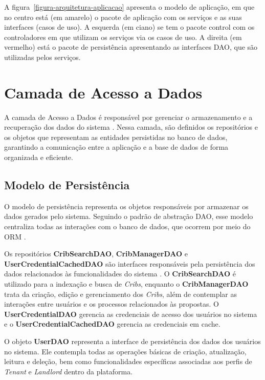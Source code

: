 A figura~\ref{figura-arquitetura-aplicacao} apresenta o modelo de aplicação, em que no centro está (em amarelo) o pacote de aplicação com os serviços e as suas interfaces (casos de uso). A esquerda (em ciano) se tem o pacote control com os controladores em que utilizam os serviços via os casos de uso. A direita (em vermelho) está o pacote de persistência apresentando as interfaces DAO, que são utilizadas pelos serviços.


\section{Camada de Acesso a Dados}
\label{sec-frameweb-dados}

A camada de Acesso a Dados é responsável por gerenciar o armazenamento e a recuperação dos dados do sistema \cite{phdthesis}. Nessa camada, são definidos os repositórios e os objetos que representam as entidades persistidas no banco de dados, garantindo a comunicação entre a aplicação e a base de dados de forma organizada e eficiente.


\subsection{Modelo de Persistência}

O modelo de persistência representa os objetos responsáveis por armazenar os dados gerados pelo sistema. Seguindo o padrão de abstração DAO, esse modelo centraliza todas as interações com o banco de dados, que ocorrem por meio do ORM \cite{phdthesis}.

Os repositórios \textbf{CribSearchDAO}, \textbf{CribManagerDAO} e \textbf{UserCredentialCachedDAO} são interfaces responsáveis pela persistência dos dados relacionados às funcionalidades do sistema \emph{\imprimirtitulo}. O \textbf{CribSearchDAO} é utilizado para a indexação e busca de \emph{Cribs}, enquanto o \textbf{CribManagerDAO} trata da criação, edição e gerenciamento dos \emph{Cribs}, além de contemplar as interações entre usuários e os processos relacionados às propostas. O \textbf{UserCredentialDAO} gerencia as credenciais de acesso dos usuários no sistema e o \textbf{UserCredentialCachedDAO} gerencia as credenciais em cache.

O objeto \textbf{UserDAO} representa a interface de persistência dos dados dos usuários no sistema. Ele contempla todas as operações básicas de criação, atualização, leitura e deleção, bem como funcionalidades específicas associadas aos perfis de \emph{Tenant} e \emph{Landlord} dentro da plataforma.

